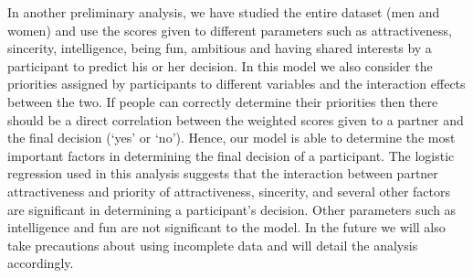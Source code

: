 \documentclass{article}
\begin{document}
In another preliminary analysis, we have studied the entire dataset (men and women) and use the scores given to different parameters such as attractiveness, sincerity, intelligence, being fun, ambitious and having shared interests by a participant to predict his or her decision. In this model we also consider the priorities assigned by participants to different variables and the interaction effects between the two. If people can correctly determine their priorities then there should be a direct correlation between the weighted scores given to a partner and the final decision (`yes' or `no').  Hence, our model is able to determine the most important factors in determining the final decision of a participant. The logistic regression used in this analysis suggests that the interaction between partner attractiveness and priority of attractiveness, sincerity, and several other factors are significant in determining a participant's decision.  Other parameters such as intelligence and fun are not significant to the model.  In the future we will also take precautions about using incomplete data and will detail the analysis accordingly.\\




 
 
\end{document}
